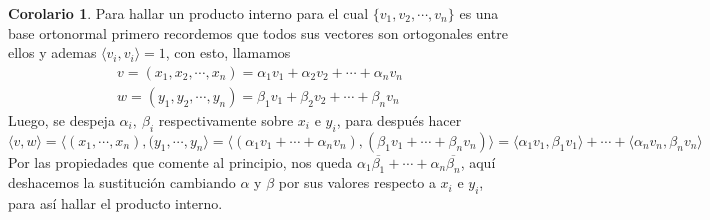 \documentclass[10pt]{article}
\theoremstyle{definition}
\newtheorem{corollary}{Corolario}[theorem]
\begin{document}
\begin{corollary}
	Para hallar un producto interno para el cual $\{v_1,v_2,\cdots,v_n\}$ es una base ortonormal primero recordemos que todos sus vectores son ortogonales entre ellos y ademas $\langle v_i,v_i\rangle=1$, con esto, llamamos
	$$\begin{matrix}
			v=( x_{1} ,x_{2} ,\cdots ,x_{n}) =\alpha _{1} v_{1} +\alpha _{2} v_{2} +\cdots +\alpha _{n} v_{n} \\
			w=( y_{1} ,y_{2} ,\cdots ,y_{n}) =\beta _{1} v_{1} +\beta _{2} v_{2} +\cdots +\beta _{n} v_{n}
		\end{matrix}$$
	Luego, se despeja $\alpha_i,\ \beta_i$ respectivamente sobre $x_i$ e $y_i$, para después hacer $$\langle v,w\rangle=\langle (x_1,\cdots,x_n),(y_1,\cdots,y_n\rangle=\langle(\alpha_1v_1+\cdots+\alpha_nv_n),(\beta_1v_1+\cdots+\beta_nv_n)\rangle=\langle\alpha_1v_1,\beta_1v_1\rangle+\cdots+\langle\alpha_nv_n,\beta_nv_n\rangle$$
	Por las propiedades que comente al principio, nos queda $\alpha_1\overline{\beta_1}+\cdots+\alpha_n\overline{\beta_n}$, aquí deshacemos la sustitución cambiando $\alpha$ y $\beta$ por sus valores respecto a $x_i$ e $y_i$, para así hallar el producto interno.
\end{corollary}
\end{document}
